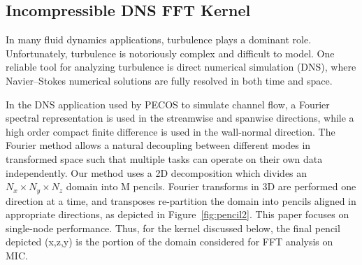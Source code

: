 \subsection{Incompressible DNS FFT Kernel}
\label{sec:dns}

In many fluid dynamics applications, turbulence plays a
dominant role. Unfortunately, turbulence is notoriously complex and
difficult to model.  One reliable
tool for analyzing turbulence is direct
numerical simulation (DNS)\cite{jimenez:2007}, where Navier--Stokes numerical solutions
are fully resolved
in both time and space. 



In the DNS application used
by PECOS to simulate channel flow, a Fourier spectral
representation is used in the streamwise and spanwise directions,
while a high order compact finite difference is used in the
wall-normal direction\cite{KMM:87,Lele:92}.
The Fourier method allows a natural decoupling between different modes
in transformed space such that multiple tasks can operate on their own data
independently. Our method uses a 2D decomposition which divides an $N_x
\times N_y \times N_z$ domain into M pencils. Fourier transforms in 3D
are performed one direction at a time, and transposes 
re-partition the domain into pencils aligned in appropriate
directions,
as depicted in Figure~\ref{fig:pencil2}. This
paper focuses on single-node performance.  Thus,
for the kernel discussed below, the final pencil depicted (x,z,y) is
the portion of the domain considered for FFT analysis on MIC.

